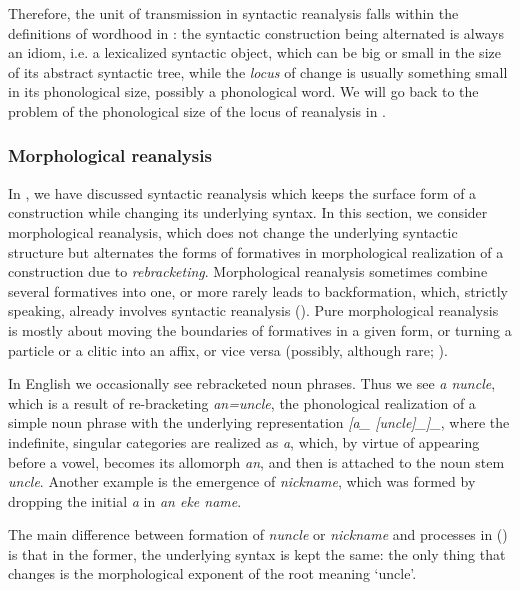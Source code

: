 \documentclass[a4paper, oneside, scheme=plain, 12pt]{article}
\newcommand*{\citepages}[1]{pp.~{#1}}
\newcommand{\form}[1]{\emph{#1}}
\newcommand{\translate}[1]{`#1'}
\newcommand*{\category}[1]{\textsc{#1}}
\begin{document}
Therefore, the unit of transmission in syntactic reanalysis
falls within the definitions of wordhood in :
the syntactic construction being alternated is always an idiom, i.e. a lexicalized syntactic object,
which can be big or small in the size of its abstract syntactic tree,
while the \emph{locus} of change is usually something small in its phonological size,
possibly a phonological word.
We will go back to the problem of the phonological size of the locus of reanalysis in .

\subsubsection{Morphological reanalysis}\label{sec:reanalysis-form-change}

In ,
we have discussed syntactic reanalysis which keeps the surface form of a construction
while changing its underlying syntax.
In this section, we consider morphological reanalysis,
which does not change the underlying syntactic structure
but alternates the forms of formatives in morphological realization of a construction
due to \emph{rebracketing}.
Morphological reanalysis sometimes combine several formatives into one,
or more rarely leads to backformation,
which, strictly speaking, already involves syntactic reanalysis
().
Pure morphological reanalysis is mostly about moving the boundaries of formatives in a given form,
or turning a particle or a clitic into an affix, or vice versa
(possibly, although rare; \citealt[\citepages{251}]{campbell2013historical}).

In English we occasionally see rebracketed noun phrases.
Thus we see \form{a nuncle}, which is a result of re-bracketing \form{an=uncle},
the phonological realization of a simple noun phrase with the underlying representation
\form{[a_{\text{\category{singular,indefinite}}} [uncle]_{\text{noun stem}}]_{\text{noun phrase}}},
where the indefinite, singular categories are realized as \form{a},
which, by virtue of appearing before a vowel, becomes its allomorph \form{an},
and then is attached to the noun stem \form{uncle}.
Another example is the emergence of \form{nickname},
which was formed by dropping the initial \form{a} in \form{an eke name}.

The main difference between formation of \form{nuncle} or \form{nickname}
and processes in ()
is that in the former, the underlying syntax is kept the same:
the only thing that changes is the morphological exponent of the root meaning \translate{uncle}.
\end{document}
